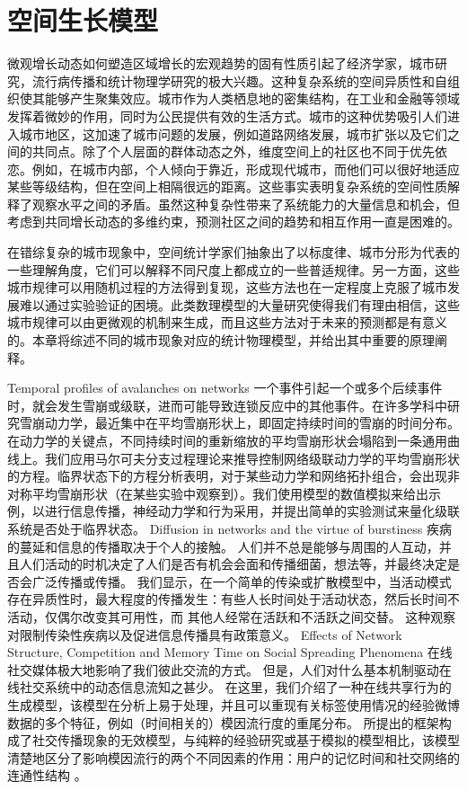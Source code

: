 \chapter{空间生长模型}

微观增长动态如何塑造区域增长的宏观趋势的固有性质引起了经济学家，城市研究，流行病传播和统计物理学研究的极大兴趣。这种复杂系统的空间异质性和自组织使其能够产生聚集效应\cite{Keuschnigg13759}。城市作为人类栖息地的密集结构，在工业和金融等领域发挥着微妙的作用，同时为公民提供有效的生活方式。城市的这种优势吸引人们进入城市地区，这加速了城市问题的发展，例如道路网络发展，城市扩张以及它们之间的共同点。除了个人层面的群体动态之外，维度空间上的社区也不同于优先依恋。例如，在城市内部，个人倾向于靠近，形成现代城市，而他们可以很好地适应某些等级结构，但在空间上相隔很远的距离。这些事实表明复杂系统的空间性质解释了观察水平之间的矛盾。虽然这种复杂性带来了系统能力的大量信息和机会，但考虑到共同增长动态的多维约束，预测社区之间的趋势和相互作用一直是困难的。

在错综复杂的城市现象中，空间统计学家们抽象出了以标度律、城市分形为代表的一些理解角度，它们可以解释不同尺度上都成立的一些普适规律。另一方面，这些城市规律可以用随机过程的方法得到复现，这些方法也在一定程度上克服了城市发展难以通过实验验证的困境。此类数理模型的大量研究使得我们有理由相信，这些城市规律可以由更微观的机制来生成，而且这些方法对于未来的预测都是有意义的。本章将综述不同的城市现象对应的统计物理模型，并给出其中重要的原理阐释。

Temporal profiles of avalanches on networks
一个事件引起一个或多个后续事件时，就会发生雪崩或级联，进而可能导致连锁反应中的其他事件。在许多学科中研究雪崩动力学，最近集中在平均雪崩形状上，即固定持续时间的雪崩的时间分布。在动力学的关键点，不同持续时间的重新缩放的平均雪崩形状会塌陷到一条通用曲线上。我们应用马尔可夫分支过程理论来推导控制网络级联动力学的平均雪崩形状的方程。临界状态下的方程分析表明，对于某些动力学和网络拓扑组合，会出现非对称平均雪崩形状（在某些实验中观察到）。我们使用模型的数值模拟来给出示例，以进行信息传播，神经动力学和行为采用，并提出简单的实验测试来量化级联系统是否处于临界状态。
Diffusion in networks and the virtue of burstiness
疾病的蔓延和信息的传播取决于个人的接触。 人们并不总是能够与周围的人互动，并且人们活动的时机决定了人们是否有机会会面和传播细菌，想法等，并最终决定是否会广泛传播或传播。 我们显示，在一个简单的传染或扩散模型中，当活动模式存在异质性时，最大程度的传播发生：有些人长时间处于活动状态，然后长时间不活动，仅偶尔改变其可用性，而 其他人经常在活跃和不活跃之间交替。 这种观察对限制传染性疾病以及促进信息传播具有政策意义。
Effects of Network Structure, Competition and Memory Time
on Social Spreading Phenomena
在线社交媒体极大地影响了我们彼此交流的方式。 但是，人们对什么基本机制驱动在线社交系统中的动态信息流知之甚少。 在这里，我们介绍了一种在线共享行为的生成模型，该模型在分析上易于处理，并且可以重现有关标签使用情况的经验微博数据的多个特征，例如（时间相关的）模因流行度的重尾分布。 所提出的框架构成了社交传播现象的无效模型，与纯粹的经验研究或基于模拟的模型相比，该模型清楚地区分了影响模因流行的两个不同因素的作用：用户的记忆时间和社交网络的连通性结构 。

